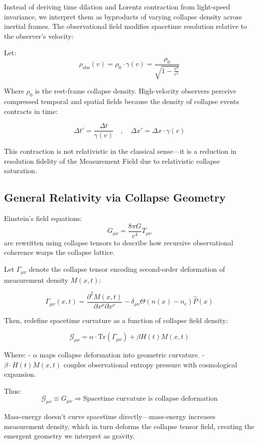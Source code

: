 Instead of deriving time dilation and Lorentz contraction from light-speed invariance, we interpret them as byproducts of varying collapse density across inertial frames. 
The observational field modifies spacetime resolution relative to the observer’s velocity:

Let:
\[
\rho_{\text{obs}}(v) = \rho_0 \cdot \gamma(v) = \frac{\rho_0}{\sqrt{1 - \frac{v^2}{c^2}}}
\]

Where \( \rho_0 \) is the rest-frame collapse density. High-velocity observers perceive compressed temporal and spatial fields because the density of collapse events contracts in time:

\[
\Delta t' = \frac{\Delta t}{\gamma(v)} \quad , \quad \Delta x' = \Delta x \cdot \gamma(v)
\]

This contraction is not relativistic in the classical sense---it is a reduction in resolution fidelity of the Measurement Field due to relativistic collapse saturation.

\subsection{General Relativity via Collapse Geometry}\cite{emergent_field_core, entanglement_structure, quantum_thermo_laws, thermalization_dynamics, blackhole_collapse_links}

Einstein’s field equations:
\[
G_{\mu\nu} = \frac{8\pi G}{c^4} T_{\mu\nu}
\]
are rewritten using collapse tensors to describe how recursive observational coherence warps the collapse lattice.

Let \( \Gamma_{\mu\nu} \) denote the collapse tensor encoding second-order deformation of measurement density \( M(x, t) \):

\[
\Gamma_{\mu\nu}(x, t) = \frac{\partial^2 M(x, t)}{\partial x^\mu \partial x^\nu} - \delta_{\mu\nu} \Theta(n(x) - n_c) \hat{P}(x)
\]

Then, redefine spacetime curvature as a function of collapse field density:

\[
\mathcal{G}_{\mu\nu} = \alpha \cdot \text{Tr}(\Gamma_{\mu\nu}) + \beta H(t) M(x,t)
\]

Where:
- \( \alpha \) maps collapse deformation into geometric curvature.
- \( \beta \cdot H(t) M(x,t) \) couples observational entropy pressure with cosmological expansion.

Thus:
\[
\mathcal{G}_{\mu\nu} \equiv G_{\mu\nu} \Rightarrow \text{Spacetime curvature is collapse deformation}
\]

Mass-energy doesn’t curve spacetime directly---mass-energy increases measurement density, which in turn deforms the collapse tensor field, creating the emergent geometry we interpret as gravity.


